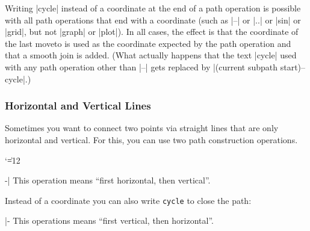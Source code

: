 Writing |cycle| instead of a coordinate at the end of a path operation is
possible with all path operations that end with a coordinate (such as |--| or
|..| or |sin| or |grid|, but not |graph| or |plot|). In all cases, the effect
is that the coordinate of the last moveto is used as the coordinate expected by
the path operation and that a smooth join is added. (What actually happens that
the text |cycle| used with any path operation other than |--| gets replaced by
|(current subpath start)--cycle|.)


\subsubsection{Horizontal and Vertical Lines}

Sometimes you want to connect two points via straight lines that are only
horizontal and vertical. For this, you can use two path construction
operations.

{\catcode`\|=12
\begin{pathoperation}[noindex]{-|}{}
    This operation means ``first horizontal, then vertical''.
\begin{codeexample}[]
\end{codeexample}
    Instead of a coordinate you can also write \verb!cycle! to close the path:
\begin{codeexample}[]
\end{codeexample}
\end{pathoperation}

\begin{pathoperation}[noindex]{|-}{}
    This operations means ``first vertical, then horizontal''.
\end{pathoperation}
}


